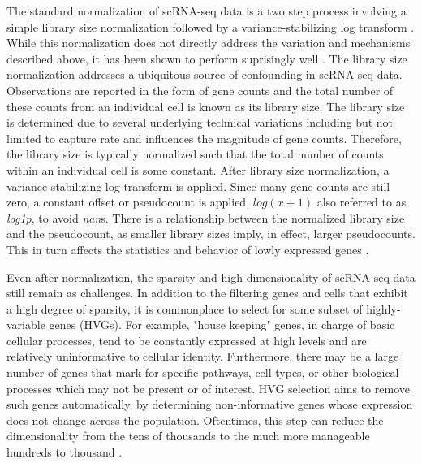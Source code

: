 The standard normalization of scRNA-seq data is a two step process involving a simple library size normalization followed by a variance-stabilizing log transform \cite{luecken2019}.
While this normalization does not directly address the variation and mechanisms described above, it has been shown to perform suprisingly well \cite{ahlmann-eltze2023}.
The library size normalization addresses a ubiquitous source of confounding in scRNA-seq data.
Observations are reported in the form of gene counts and the total number of these counts from an individual cell is known as its library size.
The library size is determined due to several underlying technical variations including but not limited to capture rate \cite{lytal2020} and influences the magnitude of gene counts.
Therefore, the library size is typically normalized such that the total number of counts within an individual cell is some constant.
After library size normalization, a variance-stabilizing log transform is applied.
Since many gene counts are still zero, a constant offset or pseudocount is applied, $log(x + 1)$ also referred to as \textit{log1p}, to avoid \textit{nan}s.
There is a relationship between the normalized library size and the pseudocount, as smaller library sizes imply, in effect, larger pseudocounts.
This in turn affects the statistics and behavior of lowly expressed genes \cite{ahlmann-eltze2023}.

Even after normalization, the sparsity and high-dimensionality of scRNA-seq data still remain as challenges.
In addition to the filtering genes and cells that exhibit a high degree of sparsity, it is commonplace to select for some subset of highly-variable genes (HVGs).
For example, "house keeping" genes, in charge of basic cellular processes, tend to be constantly expressed at high levels and are relatively uninformative to cellular identity.
Furthermore, there may be a large number of genes that mark for specific pathways, cell types, or other biological processes which may not be present or of interest.
HVG selection aims to remove such genes automatically, by determining non-informative genes whose expression does not change across the population.
Oftentimes, this step can reduce the dimensionality from the tens of thousands to the much more manageable hundreds to thousand \cite{satija2015,zheng2017,stuart2019}.

